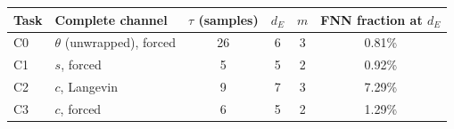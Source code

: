 \begin{tabular}{llcccc}
\toprule
Task & Complete channel & $\tau$ (samples) & $d_E$ & $m$ & FNN fraction at $d_E$\\
\midrule
C0 & $\theta$ (unwrapped), forced & 26 & 6 & 3 & 0.81\%\\
C1 & $s$, forced & 5 & 5 & 2 & 0.92\%\\
C2 & $c$, Langevin & 9 & 7 & 3 & 7.29\%\\
C3 & $c$, forced & 6 & 5 & 2 & 1.29\%\\
\bottomrule
\end{tabular}
